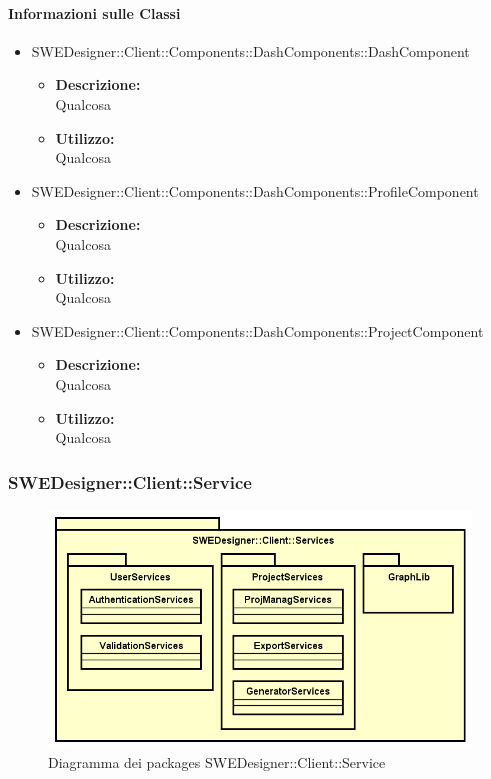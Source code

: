 		\paragraph{Informazioni sulle Classi}
		\begin{itemize}
			\item SWEDesigner::Client::Components::DashComponents::DashComponent
			\begin{itemize}
				\item \textbf{Descrizione: }\\
				Qualcosa
				\item \textbf{Utilizzo: }\\
				Qualcosa
			\end{itemize}
			\item SWEDesigner::Client::Components::DashComponents::ProfileComponent
			\begin{itemize}
				\item \textbf{Descrizione: }\\
				Qualcosa
				\item \textbf{Utilizzo: }\\
				Qualcosa
			\end{itemize}
			\item SWEDesigner::Client::Components::DashComponents::ProjectComponent
			\begin{itemize}
				\item \textbf{Descrizione: }\\
				Qualcosa
				\item \textbf{Utilizzo: }\\
				Qualcosa
			\end{itemize}
		\end{itemize}	

\subsubsection{SWEDesigner::Client::Service}
		 \begin{figure}[h!]
		\centering
		\includegraphics[scale=0.4]{Disegnetti/SWEDesigner__Client__Services.png}
		\caption{Diagramma dei packages SWEDesigner::Client::Service}
 		\end{figure}
